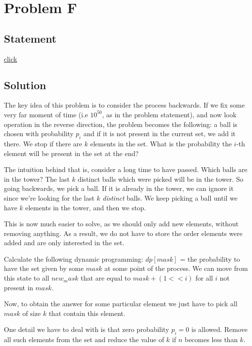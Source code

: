 \section{Problem F}
\subsection{Statement}
\href{http://foobar.iiitd.edu.in/contest/team/problem.php?id=532}{click}

\subsection{Solution}
The key idea of this problem is to consider the process backwards. If we fix some very far moment of time (i.e $10^{50}$, as in the 
problem statement), and now look operation in the reverse direction, the problem becomes the following: a ball is chosen with probability
$p_i$ and if it is not present in the current set, we add it there. We stop if there are $k$ elements in the set. What is the probability
the $i$-th element will be present in the set at the end? 

The intuition behind that is, consider a long time to have passed. Which balls are in the tower? The last $k$ distinct balls
which were picked will be in the tower. So going backwards, we pick a ball. If it is already in the tower, we can ignore it since
we're looking for the last $k$ \emph{distinct} balls. We keep picking a ball until we have $k$ elements in the tower, and then we stop.

This is now much easier to solve, as we should only add new elements, without removing anything. As a result, we do not have to store the
order elements were added and are only interested in the set. 

Calculate the following dynamic programming: $dp[mask]$ = the probability to have the set given by some $mask$ at some point of the 
process. We can move from this state to all $new_mask$ that are equal to $mask + (1 << i)$ for all $i$ not present in $mask$.

Now, to obtain the answer for some particular element we just have to pick all $mask$ of size $k$ that contain this element.

One detail we have to deal with is that zero probability $p_i = 0$ is allowed. Remove all such elements from the set and reduce the value
of $k$ if $n$ becomes less than $k$.
